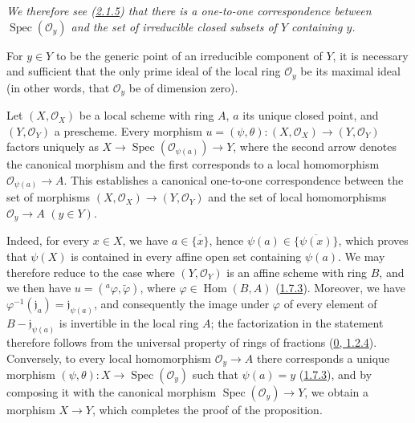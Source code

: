 \emph{We therefore see (\hyperref[I.2.1.5]{2.1.5}) that there is a
one-to-one correspondence between $\operatorname{Spec}(\mathscr{O}_y)$ and
the set of irreducible closed subsets of $Y$ containing $y$.}

\begin{corollary}[2.4.3]
\label{I.2.4.3}
For $y\in Y$ to be the generic point of an irreducible component of
$Y$, it is necessary and sufficient that the only prime ideal of the local
ring $\mathscr{O}_y$ be its maximal ideal (in other words, that
$\mathscr{O}_y$ be of dimension zero).
\end{corollary}

\begin{proposition}[2.4.4]
\label{I.2.4.4}
Let $(X,\mathscr{O}_X)$ be a local scheme with ring $A$, $a$ its unique
closed point, and $(Y,\mathscr{O}_Y)$ a prescheme. Every morphism
$u=(\psi,\theta):(X,\mathscr{O}_X)\to(Y,\mathscr{O}_Y)$ factors uniquely
as $X\to\operatorname{Spec}(\mathscr{O}_{\psi(a)})\to Y$, where the second
arrow denotes the canonical morphism and the first corresponds to a local
homomorphism $\mathscr{O}_{\psi(a)}\to A$. This establishes a canonical
one-to-one correspondence between the set of morphisms
$(X,\mathscr{O}_X)\to(Y,\mathscr{O}_Y)$ and the set of local homomorphisms
$\mathscr{O}_y\to A$ $(y\in Y)$.
\end{proposition}

Indeed, for every $x\in X$, we have $a\in\overline{\{x\}}$, hence
$\psi(a)\in\overline{\{\psi(x)\}}$, which proves that $\psi(X)$ is contained
in every affine open set containing $\psi(a)$. We may therefore reduce to
the case where $(Y,\mathscr{O}_Y)$ is an affine scheme with ring $B$, and we
then have $u=({}^a\varphi,\widetilde{\varphi})$, where
$\varphi\in\operatorname{Hom}(B,A)$ (\hyperref[I.1.7.3]{1.7.3}).
Moreover, we have $\varphi^{-1}(\mathfrak{j}_a)=\mathfrak{j}_{\psi(a)}$, and
consequently the image under $\varphi$ of every element of
$B-\mathfrak{j}_{\psi(a)}$ is invertible in the local ring $A$; the
factorization in the statement therefore follows from the universal property
of rings of fractions (\hyperref[0.1.2.4]{0, 1.2.4}). Conversely, to
every local homomorphism $\mathscr{O}_y\to A$ there corresponds a unique
morphism $(\psi,\theta):X\to\operatorname{Spec}(\mathscr{O}_y)$ such that
$\psi(a)=y$ (\hyperref[I.1.7.3]{1.7.3}), and by composing it with the
canonical morphism $\operatorname{Spec}(\mathscr{O}_y)\to Y$, we obtain a
morphism $X\to Y$, which completes the proof of the proposition.

